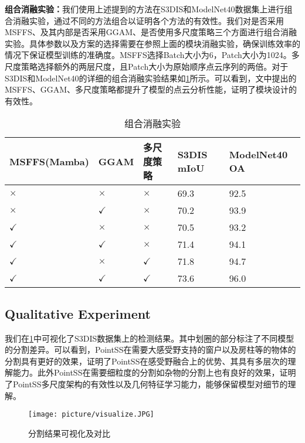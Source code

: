 \documentclass[preprint,12pt]{elsarticle}
\begin{document}
\textbf{组合消融实验：}我们使用上述提到的方法在S3DIS和ModelNet40数据集上进行组合消融实验，通过不同的方法组合以证明各个方法的有效性。我们对是否采用MSFFS、及其内部是否采用GGAM、是否使用多尺度策略三个方面进行组合消融实验。具体参数以及方案的选择需要在参照上面的模块消融实验，确保训练效率的情况下保证模型训练的准确度。MSFFS选择Batch大小为6，Patch大小为1024。多尺度策略选择额外的两层尺度，且Patch大小为原始顺序点云序列的两倍。对于S3DIS和ModelNet40的详细的组合消融实验结果如\cref{tab:combine}所示。可以看到，文中提出的MSFFS、GGAM、多尺度策略都提升了模型的点云分析性能，证明了模块设计的有效性。
\begin{table}[htbp!]
	\centering
	\caption{组合消融实验}
	\label{tab:combine}
	\begin{tabular}{@{}lllll@{}}
		\toprule
		MSFFS(Mamba) & GGAM & 多尺度策略 & S3DIS mIoU & ModelNet40 OA \\
		\midrule
		$\times$        & $\times$        & $\times$        & 69.3         & 92.5          \\
		$\times$        & $\checkmark$    & $\times$        & 70.2         & 93.9          \\
		$\checkmark$    & $\times$        & $\times$        & 70.5         & 93.2          \\
		$\checkmark$    & $\checkmark$    & $\times$        & 71.4         & 94.1          \\
		$\checkmark$    & $\times$        & $\checkmark$    & 71.8         & 94.7          \\
		$\checkmark$    & $\checkmark$    & $\checkmark$    & 73.6         & 96.0          \\
		\bottomrule
	\end{tabular}
\end{table}

\subsection{Qualitative Experiment}
我们在\cref{fig:vis}中可视化了S3DIS数据集上的检测结果。其中划圈的部分标注了不同模型的分割差异。可以看到，PointSS在需要大感受野支持的窗户以及房柱等的物体的分割具有更好的效果，证明了PointSS在感受野融合上的优势、其具有多层次的理解能力。此外PointSS在需要细粒度的分割如杂物的分割上也有良好的效果，证明了PointSS多尺度架构的有效性以及几何特征学习能力，能够保留模型对细节的理解。
\begin{figure}[htbp]
	\centering
	\texttt{[image: picture/visualize.JPG]}
	\caption{分割结果可视化及对比}
	\label{fig:vis}
\end{figure}
\end{document}
